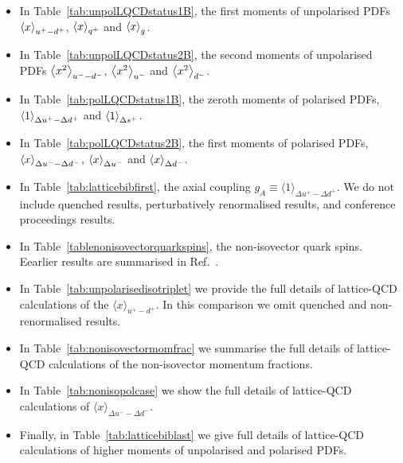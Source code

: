 \begin{itemize}

\item In Table~\ref{tab:unpolLQCDstatus1B}, the first moments of unpolarised 
PDFs $\left\langle x\right\rangle_{u^+-d^+}$, $\left\langle x\right\rangle_{q^+}$ and $\left\langle x\right\rangle_g$.

\item In Table~\ref{tab:unpolLQCDstatus2B}, the second moments of unpolarised 
PDFs $\left\langle x^2\right\rangle_{u^--d^-}$, $\left\langle x^2\right\rangle_{u^-}$ and $\left\langle x^2\right\rangle_{d^-}$.

\item In Table~\ref{tab:polLQCDstatus1B}, the zeroth moments of polarised PDFs,
$\left\langle 1\right\rangle_{\Delta u^+-\Delta d^+}$ and $\left\langle 1\right\rangle_{\Delta s^+}$.

\item In Table~\ref{tab:polLQCDstatus2B}, the first moments of polarised PDFs,
$\left\langle x\right\rangle_{\Delta u^--\Delta d^-}$, $\left\langle x\right\rangle_{\Delta u^-}$ and  $\left\langle x\right\rangle_{\Delta d^-}$.

\item In Table~\ref{tab:latticebibfirst}, the axial coupling 
$g_A\equiv\langle 1\rangle_{\Delta u^+-\Delta d^+}$.
%
We do not include quenched results, perturbatively renormalised results, 
and conference proceedings results.

\item In Table~\ref{tablenonisovectorquarkspins}, the non-isovector quark 
spins.
%
Eearlier results are summarised in Ref.~\cite{Liu:1995kb}.

\item In Table~\ref{tab:unpolarisedisotriplet} we provide the full details of
  lattice-QCD calculations of the $\langle x\rangle_{u^+-d^+}$.
  In this comparison we
  omit quenched and non-renormalised results.

\item In Table~\ref{tab:nonisovectormomfrac}
  we summarise
  the full details of lattice-QCD calculations of the non-isovector momentum fractions.

\item In Table~\ref{tab:nonisopolcase}
  we show the full details of lattice-QCD calculations of $\langle x\rangle_{\Delta u^--\Delta d^-}$.

\item Finally, in  Table~\ref{tab:latticebiblast} we
  give full details of lattice-QCD calculations of higher moments of unpolarised
  and polarised PDFs.

\end{itemize}

